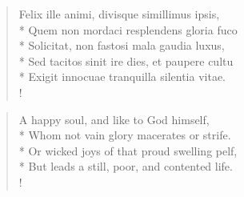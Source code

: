 {\begin{latin}
\begin{verse}%
Felix ille animi, divisque simillimus ipsis,\\*
Quem non mordaci resplendens gloria fuco\\*
Solicitat, non fastosi mala gaudia luxus,\\*
Sed tacitos sinit ire dies, et paupere cultu\\*
Exigit innocuae tranquilla silentia vitae.\\!
\end{verse}%
\end{latin}
\translationrule%
\begin{verse}%
A happy soul, and like to God himself,\\*
Whom not vain glory macerates or strife.\\*
Or wicked joys of that proud swelling pelf,\\*
But leads a still, poor, and contented life.\\!
\end{verse}%
%

}
